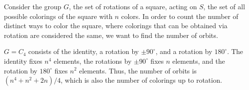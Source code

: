 \begin{example}
\exlabel 

Consider the group $G$, the set of rotations of a square, acting on $S$, the set of all possible colorings of the square with $n$ colors. In order to count the number of distinct ways to color the square, where colorings that can be obtained via rotation are considered the same, we want to find the number of orbits. 
\end{example}

$G = C_4$ consists of the identity, a rotation by $\pm 90^{\circ}$, and a rotation by $180^{\circ}$. The identity fixes $n^4$ elements, the rotations by $\pm 90^{\circ}$ fixes $n$ elements, and the rotation by $180^{\circ}$ fixes $n^2$ elements. Thus, the number of orbits is $(n^4+n^2+2n)/4$, which is also the number of colorings up to rotation.





  